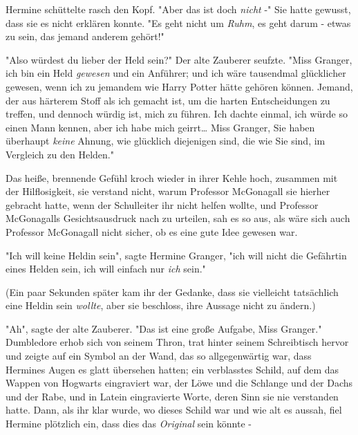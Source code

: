 {Hermine schüttelte rasch den Kopf. "Aber das ist doch \emph{nicht} -" Sie hatte gewusst, dass sie es nicht erklären konnte. "Es geht nicht um \emph{Ruhm}, es geht darum - etwas zu sein, das jemand anderem gehört!"

"Also würdest du lieber der Held sein?" Der alte Zauberer seufzte. "Miss Granger, ich bin ein Held \emph{gewesen} und ein Anführer; und ich wäre tausendmal glücklicher gewesen, wenn ich zu jemandem wie Harry Potter hätte gehören können. Jemand, der aus härterem Stoff als ich gemacht ist, um die harten Entscheidungen zu treffen, und dennoch würdig ist, mich zu führen. Ich dachte einmal, ich würde so einen Mann kennen, aber ich habe mich geirrt… Miss Granger, Sie haben überhaupt \emph{keine} Ahnung, wie glücklich diejenigen sind, die wie Sie sind, im Vergleich zu den Helden."

Das heiße, brennende Gefühl kroch wieder in ihrer Kehle hoch, zusammen mit der Hilflosigkeit, sie verstand nicht, warum Professor McGonagall sie hierher gebracht hatte, wenn der Schulleiter ihr nicht helfen wollte, und Professor McGonagalls Gesichtsausdruck nach zu urteilen, sah es so aus, als wäre sich auch Professor McGonagall nicht sicher, ob es eine gute Idee gewesen war.

"Ich will keine Heldin sein", sagte Hermine Granger, "ich will nicht die Gefährtin eines Helden sein, ich will einfach nur \emph{ich} sein."

(Ein paar Sekunden später kam ihr der Gedanke, dass sie vielleicht tatsächlich eine Heldin sein \emph{wollte}, aber sie beschloss, ihre Aussage nicht zu ändern.)

"Ah", sagte der alte Zauberer. "Das ist eine große Aufgabe, Miss Granger." Dumbledore erhob sich von seinem Thron, trat hinter seinem Schreibtisch hervor und zeigte auf ein Symbol an der Wand, das so allgegenwärtig war, dass Hermines Augen es glatt übersehen hatten; ein verblasstes Schild, auf dem das Wappen von Hogwarts eingraviert war, der Löwe und die Schlange und der Dachs und der Rabe, und in Latein eingravierte Worte, deren Sinn sie nie verstanden hatte. Dann, als ihr klar wurde, wo dieses Schild war und wie alt es aussah, fiel Hermine plötzlich ein, dass dies das \emph{Original} sein könnte -

}

